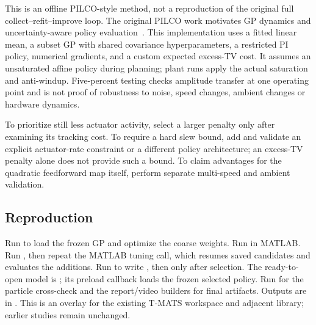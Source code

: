 This is an offline PILCO-style method, not a reproduction of the original full collect--refit--improve loop. The original PILCO work motivates GP dynamics and uncertainty-aware policy evaluation~\cite{pilco}. This implementation uses a fitted linear mean, a subset GP with shared covariance hyperparameters, a restricted PI policy, numerical gradients, and a custom expected excess-TV cost. It assumes an unsaturated affine policy during planning; plant runs apply the actual saturation and anti-windup. Five-percent testing checks amplitude transfer at one operating point and is not proof of robustness to noise, speed changes, ambient changes or hardware dynamics.

To prioritize still less actuator activity, select a larger penalty only after examining its tracking cost. To require a hard slew bound, add and validate an explicit actuator-rate constraint or a different policy architecture; an excess-TV penalty alone does not provide such a bound. To claim advantages for the quadratic feedforward map itself, perform separate multi-speed and ambient validation.

\subsection{Reproduction}
Run  to load the frozen GP and optimize the coarse weights. Run  in MATLAB. Run , then repeat the MATLAB tuning call, which resumes saved candidates and evaluates the additions. Run  to write , then  only after selection. The ready-to-open model is ; its preload callback loads the frozen selected policy. Run  for the particle cross-check and the report/video builders for final artifacts. Outputs are in . This is an overlay for the existing T-MATS workspace and adjacent library; earlier studies remain unchanged.



